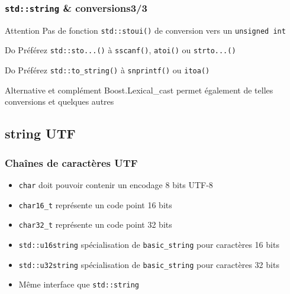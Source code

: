 \documentclass[C++.tex]{subfiles}
\begin{document}
\begin{frame}[fragile]
	\frametitle{\lstinline|std::string| \& conversions\titlehfill{}3/3}
	\begin{alertblock}{Attention}
		Pas de fonction \lstinline|std::stoui()| de conversion vers un \lstinline|unsigned int|
	\end{alertblock}

	\begin{exampleblock}{Do}
		Préférez \lstinline|std::sto...()| à \lstinline|sscanf()|, \lstinline|atoi()| ou \lstinline|strto...()|
	\end{exampleblock}

	\begin{exampleblock}{Do}
		Préférez \lstinline|std::to_string()| à \lstinline|snprintf()| ou \lstinline|itoa()|
	\end{exampleblock}

	\begin{block}{Alternative et complément}
		Boost.Lexical\_cast permet également de telles conversions et quelques autres
	\end{block}
\end{frame}

\subsection*{string UTF}
\begin{frame}[fragile]
	\frametitle{Chaînes de caractères UTF}
	\begin{itemize}
		\item \lstinline|char| doit pouvoir contenir un encodage 8 bits UTF-8


		\item \lstinline|char16_t| représente un code point 16 bits
		\item \lstinline|char32_t| représente un code point 32 bits
		\item \lstinline|std::u16string| spécialisation de \lstinline|basic_string| pour caractères 16 bits
		\item \lstinline|std::u32string| spécialisation de \lstinline|basic_string| pour caractères 32 bits
		\item Même interface que \lstinline|std::string|
	\end{itemize}
\end{frame}
\end{document}

